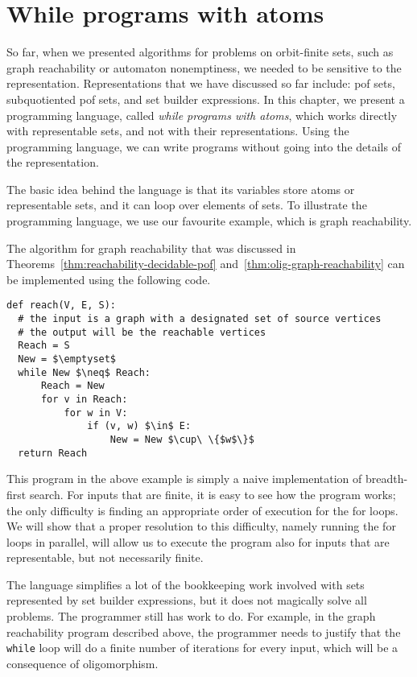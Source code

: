 \chapter{While programs with atoms}
\label{cha:while-programs}
So far, when we presented algorithms for problems on orbit-finite sets, such as graph reachability or automaton nonemptiness, we needed to be sensitive to the representation.  Representations that we have discussed so far include: pof sets, subquotiented pof sets, and set builder expressions.  
In this chapter, we present a programming language, called \emph{while programs with atoms}, which works directly with representable sets, and not with their representations. Using the programming language, we can write programs without going into the details of the representation. 


The basic idea behind the language is that its variables store  atoms or representable sets,  and it can loop over elements of  sets. 
 To illustrate the programming language, we use our favourite example, which is   graph reachability. 
 
 
 \begin{myexample}
\label{ex:graph-reachability-source-code}
The  algorithm for graph reachability that was discussed in  Theorems~\ref{thm:reachability-decidable-pof} and~\ref{thm:olig-graph-reachability} can be implemented using the following code.


 \begin{lstlisting}
def reach(V, E, S):
  # the input is a graph with a designated set of source vertices
  # the output will be the reachable vertices
  Reach = S
  New = $\emptyset$
  while New $\neq$ Reach:
      Reach = New
      for v in Reach:
          for w in V:
              if (v, w) $\in$ E:
                  New = New $\cup\ \{$w$\}$
  return Reach
  \end{lstlisting}
 \end{myexample}

This program in the above example is simply a naive implementation of breadth-first search. For inputs that are finite, it is easy to see how the program works; the only difficulty is finding an appropriate order of execution for the for loops. We will show that a proper resolution to this difficulty, namely running the for loops in parallel, will allow us to execute the program also for inputs that are representable, but not necessarily finite.

The language simplifies a lot of the bookkeeping work involved with sets represented by set builder expressions, but it does not magically solve all problems. The programmer still has work to do. For example, in the graph reachability program described above, the programmer needs to justify that the {\tt while} loop will do a finite number of iterations for every input, which will be a consequence of oligomorphism.

